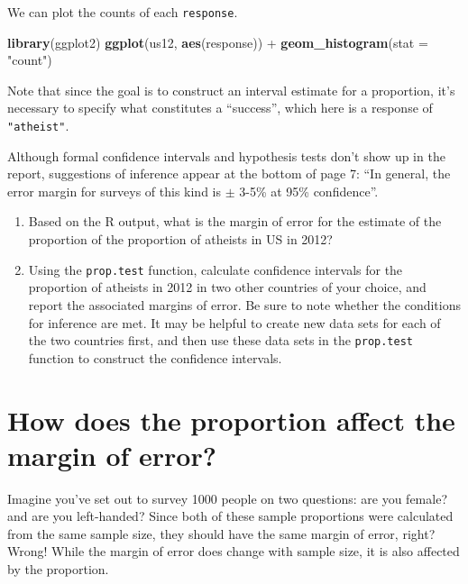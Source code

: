 \documentclass[]{book}
\newenvironment{Shaded}{\begin{snugshade}}{\end{snugshade}}
\newcommand{\KeywordTok}[1]{\textcolor[rgb]{0.13,0.29,0.53}{\textbf{{#1}}}}
\newcommand{\DataTypeTok}[1]{\textcolor[rgb]{0.13,0.29,0.53}{{#1}}}
\newcommand{\StringTok}[1]{\textcolor[rgb]{0.31,0.60,0.02}{{#1}}}
\newcommand{\NormalTok}[1]{{#1}}
\theoremstyle{definition}
\theoremstyle{definition}
\theoremstyle{remark}
\begin{document}
We can plot the counts of each \texttt{response}.

\begin{Shaded}
\begin{Highlighting}[]
\KeywordTok{library}\NormalTok{(ggplot2)}
\KeywordTok{ggplot}\NormalTok{(us12, }\KeywordTok{aes}\NormalTok{(response)) +}\StringTok{ }\KeywordTok{geom_histogram}\NormalTok{(}\DataTypeTok{stat =} \StringTok{"count"}\NormalTok{)}
\end{Highlighting}
\end{Shaded}

Note that since the goal is to construct an interval estimate for a
proportion, it's necessary to specify what constitutes a ``success'',
which here is a response of \texttt{"atheist"}.

Although formal confidence intervals and hypothesis tests don't show up
in the report, suggestions of inference appear at the bottom of page 7:
``In general, the error margin for surveys of this kind is \(\pm\) 3-5\%
at 95\% confidence''.

\begin{enumerate}
\def\labelenumi{\arabic{enumi}.}
\setcounter{enumi}{5}
\item
  Based on the R output, what is the margin of error for the estimate of
  the proportion of the proportion of atheists in US in 2012?
\item
  Using the \texttt{prop.test} function, calculate confidence intervals
  for the proportion of atheists in 2012 in two other countries of your
  choice, and report the associated margins of error. Be sure to note
  whether the conditions for inference are met. It may be helpful to
  create new data sets for each of the two countries first, and then use
  these data sets in the \texttt{prop.test} function to construct the
  confidence intervals.
\end{enumerate}

\section*{How does the proportion affect the margin of
error?}\label{how-does-the-proportion-affect-the-margin-of-error}

Imagine you've set out to survey 1000 people on two questions: are you
female? and are you left-handed? Since both of these sample proportions
were calculated from the same sample size, they should have the same
margin of error, right? Wrong! While the margin of error does change
with sample size, it is also affected by the proportion.
\end{document}
